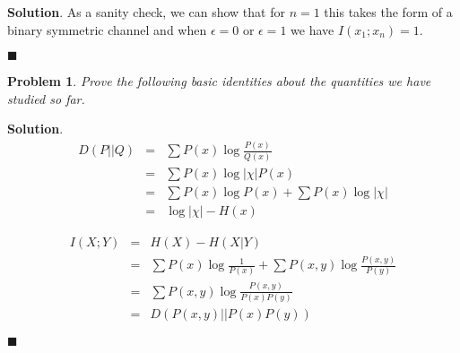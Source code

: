 \documentclass[12pt]{article}
\newtheorem{p}{Problem}[section]
\theoremstyle{definition}
\newenvironment{s}{%
        \begin{trivlist} \item \textbf{Solution}. }{%
            \hspace*{\fill} $\blacksquare$\end{trivlist}}%
\begin{document}
{\begin{s}
As a sanity check, we can show that for $n=1$ this takes the form of a binary symmetric channel and when $\epsilon = 0$ or $\epsilon = 1$ we have $I(x_{1};x_{n})=1$.


\end{s}

\begin{p}
Prove the following basic identities about the quantities we have studied so far.
\end{p}

\begin{s}
\begin{eqnarray}
D(P||Q) &=& \sum P(x)\log \frac{P(x)}{Q(x)}\\
&=& \sum P(x)\log |\chi | P(x)\\
&=& \sum P(x) \log P(x) + \sum P(x)\log |\chi |\\
&=& \log |\chi| - H(x)
\end{eqnarray}

\begin{eqnarray}
I(X;Y) &=& H(X) - H(X|Y)\\
&=& \sum P(x)\log \frac{1}{P(x)} + \sum P(x,y)\log \frac{P(x,y)}{P(y)} \\
&=& \sum P(x,y) \log \frac{P(x,y)}{P(x)P(y)}\\
&=& D(P(x,y)||P(x)P(y))
\end{eqnarray}


\end{s}
\end{document}
